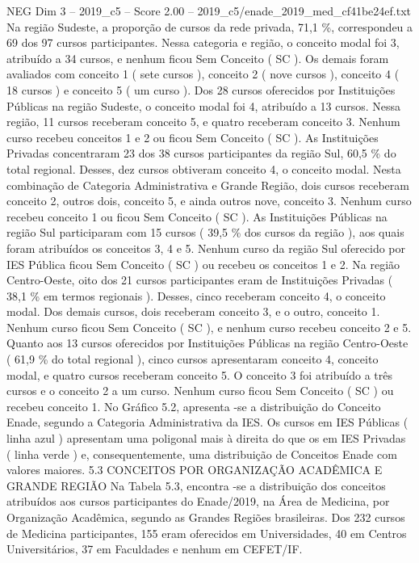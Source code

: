 \begin{textsample}{NEG Dim 3 – 2019\_c5 – Score 2.00 – 2019\_c5/enade\_2019\_med\_cf41be24ef.txt}
Na região Sudeste, a proporção de cursos da rede privada, 71,1 \%, correspondeu a 69 dos 97 cursos participantes.
Nessa categoria e região, o conceito modal foi 3, atribuído a 34 cursos, e nenhum ficou Sem Conceito ( SC ).
Os demais foram avaliados com conceito 1 ( sete cursos ), conceito 2 ( nove cursos ), conceito 4 ( 18 cursos ) e conceito 5 ( um curso ).
Dos 28 cursos oferecidos por Instituições Públicas na região Sudeste, o conceito modal foi 4, atribuído a 13 cursos.
Nessa região, 11 cursos receberam conceito 5, e quatro receberam conceito 3.
Nenhum curso recebeu conceitos 1 e 2 ou ficou Sem Conceito ( SC ).
As Instituições Privadas concentraram 23 dos 38 cursos participantes da região Sul, 60,5 \% do total regional.
Desses, dez cursos obtiveram conceito 4, o conceito modal.
Nesta combinação de Categoria Administrativa e Grande Região, dois cursos receberam conceito 2, outros dois, conceito 5, e ainda outros nove, conceito 3.
Nenhum curso recebeu conceito 1 ou ficou Sem Conceito ( SC ).
As Instituições Públicas na região Sul participaram com 15 cursos ( 39,5 \% dos cursos da região ), aos quais foram atribuídos os conceitos 3, 4 e 5.
Nenhum curso da região Sul oferecido por IES Pública ficou Sem Conceito ( SC ) ou recebeu os conceitos 1 e 2.
Na região Centro-Oeste, oito dos 21 cursos participantes eram de Instituições Privadas ( 38,1 \% em termos regionais ).
Desses, cinco receberam conceito 4, o conceito modal.
Dos demais cursos, dois receberam conceito 3, e o outro, conceito 1.
Nenhum curso ficou Sem Conceito ( SC ), e nenhum curso recebeu conceito 2 e 5.
Quanto aos 13 cursos oferecidos por Instituições Públicas na região Centro-Oeste ( 61,9 \% do total regional ), cinco cursos apresentaram conceito 4, conceito modal, e quatro cursos receberam conceito 5.
O conceito 3 foi atribuído a três cursos e o conceito 2 a um curso.
Nenhum curso ficou Sem Conceito ( SC ) ou recebeu conceito 1.
No Gráfico 5.2, apresenta -se a distribuição do Conceito Enade, segundo a Categoria Administrativa da IES.
Os cursos em IES Públicas ( linha azul ) apresentam uma poligonal mais à direita do que os em IES Privadas ( linha verde ) e, consequentemente, uma distribuição de Conceitos Enade com valores maiores. 5.3 CONCEITOS POR ORGANIZAÇÃO ACADÊMICA E GRANDE REGIÃO Na Tabela 5.3, encontra -se a distribuição dos conceitos atribuídos aos cursos participantes do Enade/2019, na Área de Medicina, por Organização Acadêmica, segundo as Grandes Regiões brasileiras.
Dos 232 cursos de Medicina participantes, 155 eram oferecidos em Universidades, 40 em Centros Universitários, 37 em Faculdades e nenhum em CEFET/IF.

\end{textsample}
